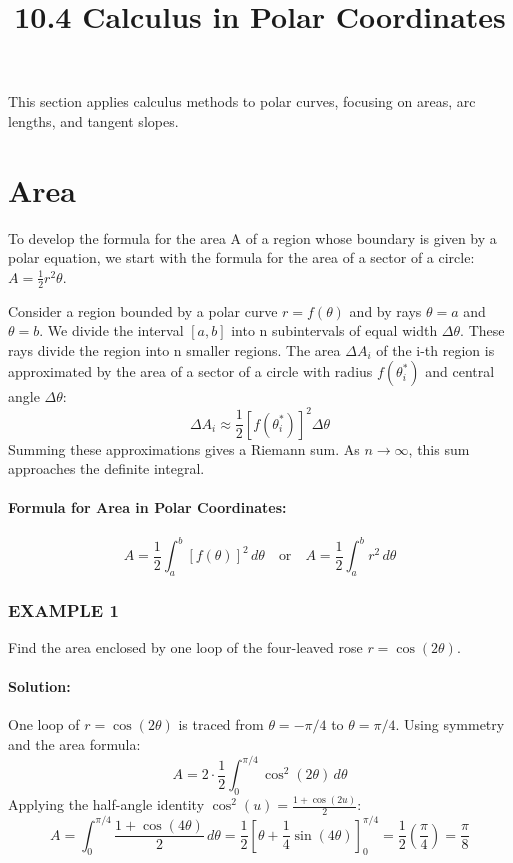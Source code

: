 \documentclass{article}
\title{10.4 Calculus in Polar Coordinates}
\date{}
\author{}
\begin{document}
\maketitle
This section applies calculus methods to polar curves, focusing on areas, arc lengths, and tangent slopes.

\section*{Area}
To develop the formula for the area A of a region whose boundary is given by a polar equation, we start with the formula for the area of a sector of a circle: $A = \frac{1}{2} r^2\theta$.

Consider a region bounded by a polar curve $r = f(\theta)$ and by rays $\theta = a$ and $\theta = b$. We divide the interval $[a,b]$ into n subintervals of equal width $\Delta\theta$. These rays divide the region into n smaller regions. The area $\Delta A_i$ of the i-th region is approximated by the area of a sector of a circle with radius $f(\theta_i^*)$ and central angle $\Delta\theta$:
\[
\Delta A_i \approx \frac{1}{2} [f(\theta_i^*)]^2 \Delta\theta
\]
Summing these approximations gives a Riemann sum. As $n \to \infty$, this sum approaches the definite integral.

\paragraph{Formula for Area in Polar Coordinates:}
\[
A = \frac{1}{2} \int_{a}^{b} [f(\theta)]^2 \, d\theta \quad \text{or} \quad A = \frac{1}{2} \int_{a}^{b} r^2 \, d\theta
\]

\subsubsection*{EXAMPLE 1}
Find the area enclosed by one loop of the four-leaved rose $r = \cos(2\theta)$.

\paragraph{Solution:} One loop of $r = \cos(2\theta)$ is traced from $\theta = -\pi/4$ to $\theta = \pi/4$. Using symmetry and the area formula:
\[
A = 2 \cdot \frac{1}{2} \int_{0}^{\pi/4} \cos^2(2\theta) \, d\theta
\]
Applying the half-angle identity $\cos^2(u) = \frac{1 + \cos(2u)}{2}$:
\[
A = \int_{0}^{\pi/4} \frac{1 + \cos(4\theta)}{2} \, d\theta = \frac{1}{2} \left[ \theta + \frac{1}{4}\sin(4\theta) \right]_{0}^{\pi/4} = \frac{1}{2} \left( \frac{\pi}{4} \right) = \frac{\pi}{8}
\]
\end{document}
